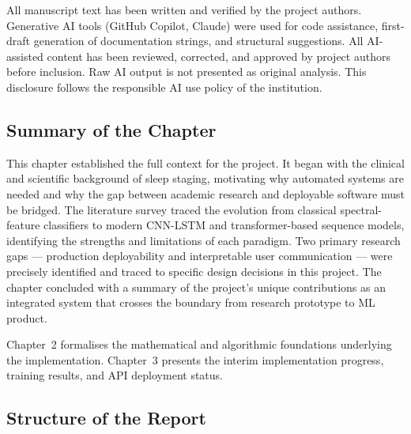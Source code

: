 \documentclass[10pt]{article}
\begin{document}
All manuscript text has been written and verified by the project authors. Generative AI tools (GitHub Copilot, Claude) were used for code assistance, first-draft generation of documentation strings, and structural suggestions. All AI-assisted content has been reviewed, corrected, and approved by project authors before inclusion. Raw AI output is not presented as original analysis. This disclosure follows the responsible AI use policy of the institution.

\subsection{Summary of the Chapter}
\label{sec:summary}

This chapter established the full context for the project. It began with the clinical and scientific background of sleep staging, motivating why automated systems are needed and why the gap between academic research and deployable software must be bridged. The literature survey traced the evolution from classical spectral-feature classifiers to modern CNN-LSTM and transformer-based sequence models, identifying the strengths and limitations of each paradigm. Two primary research gaps --- production deployability and interpretable user communication --- were precisely identified and traced to specific design decisions in this project. The chapter concluded with a summary of the project's unique contributions as an integrated system that crosses the boundary from research prototype to ML product.

Chapter~2 formalises the mathematical and algorithmic foundations underlying the implementation. Chapter~3 presents the interim implementation progress, training results, and API deployment status.

\subsection{Structure of the Report}
\label{sec:structure}
\end{document}
